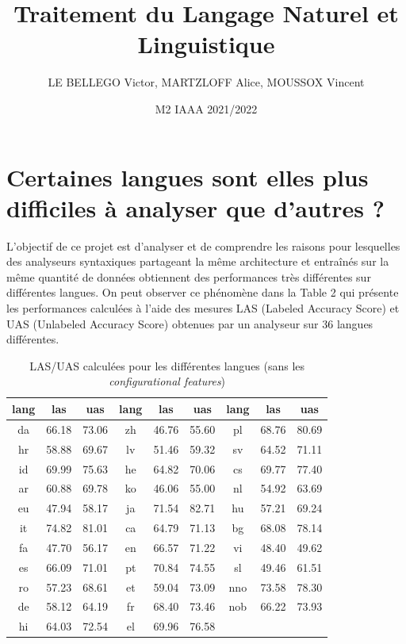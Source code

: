 \documentclass[a4paper, twoside, 12pt]{article}
\title{Traitement du Langage Naturel et Linguistique}
\date{M2 IAAA 2021/2022}
\author{LE BELLEGO Victor, MARTZLOFF Alice, MOUSSOX Vincent}
\makeatletter
\newenvironment{beware}[1][\@nil]
{	\def\tmp{#1}%
\setlength{\OuterFrameSep}{0pt}						%
\setlength{\FrameSep}{1mm}							%
\definecolor{shadecolor}{rgb}{1.00,0.80,0.80}		%
    \begin{leftbar}\noindent{}%
    \ifx\tmp\@nnil{}\else{\textbf{#1 : }}\fi}           %
    {\end{leftbar}\par}
\makeatother
\begin{document}
    \maketitle

    \section{Certaines langues sont elles plus difficiles à analyser que d’autres ?}
    L'objectif de ce projet est d'analyser et de comprendre les raisons pour lesquelles des analyseurs syntaxiques partageant la même architecture et entraînés sur la même quantité de données obtiennent des performances très différentes sur différentes langues. On peut observer ce phénomène dans la Table 2 qui présente les performances calculées à l'aide des mesures LAS (Labeled Accuracy Score) et UAS (Unlabeled Accuracy Score) obtenues par un analyseur sur 36 langues différentes.

    \begin{table}[!h]
        \centering
        \begin{tabular}{ccc|ccc|ccc}
            \toprule
            \textbf{lang} & \textbf{las} & \textbf{uas} & \textbf{lang} & \textbf{las} & \textbf{uas} & \textbf{lang} & \textbf{las} & \textbf{uas} \\
            \midrule
            da & 66.18 & 73.06 & zh & 46.76 & 55.60 & pl & 68.76 & 80.69 \\
            hr & 58.88 & 69.67 & lv & 51.46 & 59.32 & sv & 64.52 & 71.11 \\
            id & 69.99 & 75.63 & he & 64.82 & 70.06 & cs & 69.77 & 77.40 \\
            ar & 60.88 & 69.78 & ko & 46.06 & 55.00 & nl & 54.92 & 63.69 \\
            eu & 47.94 & 58.17 & ja & 71.54 & 82.71 & hu & 57.21 & 69.24 \\
            it & 74.82 & 81.01 & ca & 64.79 & 71.13 & bg & 68.08 & 78.14 \\
            fa & 47.70 & 56.17 & en & 66.57 & 71.22 & vi & 48.40 & 49.62 \\
            es & 66.09 & 71.01 & pt & 70.84 & 74.55 & sl & 49.46 & 61.51 \\
            ro & 57.23 & 68.61 & et & 59.04 & 73.09 & nno & 73.58 & 78.30 \\
            de & 58.12 & 64.19 & fr & 68.40 & 73.46 & nob & 66.22 & 73.93 \\
            hi & 64.03 & 72.54 & el & 69.96 & 76.58 &  &  &  \\
            \bottomrule
        \end{tabular}
        \caption{LAS/UAS calculées pour les différentes langues (sans les \textit{configurational features})}
        \label{tab:lasuas}
    \end{table}
\end{document}
